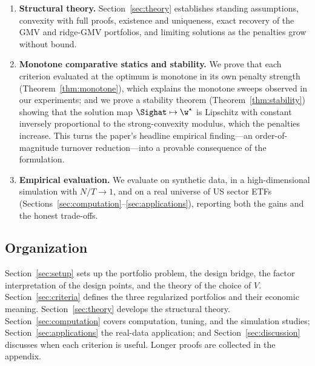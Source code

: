 \begin{enumerate}[leftmargin=1.6em,itemsep=0.3em]
  \item \textbf{Structural theory.} Section~\ref{sec:theory} establishes standing
    assumptions, convexity with full proofs, existence and uniqueness, exact
    recovery of the GMV and ridge-GMV portfolios, and limiting solutions as the
    penalties grow without bound.

  \item \textbf{Monotone comparative statics and stability.} We prove that each
    criterion evaluated at the optimum is monotone in its own penalty strength
    (Theorem~\ref{thm:monotone}), which explains the monotone sweeps observed in
    our experiments; and we prove a stability theorem
    (Theorem~\ref{thm:stability}) showing that the solution map
    $\Sighat\mapsto\w^\star$ is Lipschitz with constant inversely proportional to
    the strong-convexity modulus, which the penalties increase. This turns the
    paper's headline empirical finding---an order-of-magnitude turnover
    reduction---into a provable consequence of the formulation.

  \item \textbf{Empirical evaluation.} We evaluate on synthetic data, in a
    high-dimensional simulation with $N/T\to1$, and on a real universe of US
    sector ETFs (Sections~\ref{sec:computation}--\ref{sec:applications}),
    reporting both the gains and the honest trade-offs.
\end{enumerate}

\subsection{Organization}
Section~\ref{sec:setup} sets up the portfolio problem, the design bridge, the
factor interpretation of the design points, and the theory of the choice of $V$.
Section~\ref{sec:criteria} defines the three regularized portfolios and their
economic meaning. Section~\ref{sec:theory} develops the structural theory.
Section~\ref{sec:computation} covers computation, tuning, and the simulation
studies; Section~\ref{sec:applications} the real-data application; and
Section~\ref{sec:discussion} discusses when each criterion is useful. Longer
proofs are collected in the appendix.
